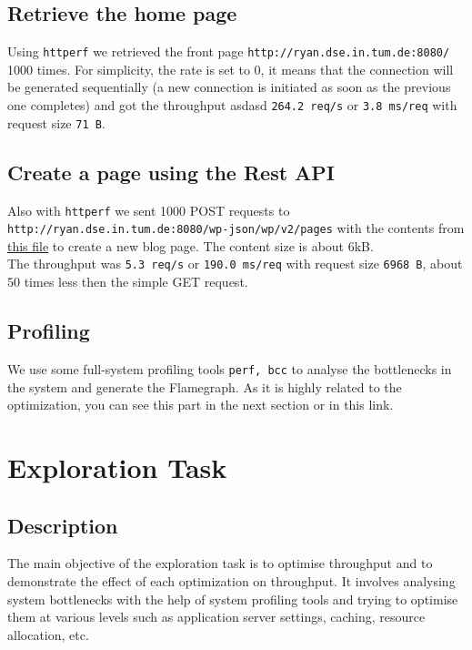 \subsection{Retrieve the home page}

Using \texttt{httperf} we retrieved the front page \texttt{http://ryan.dse.in.tum.de:8080/} 1000 times. For simplicity, the rate is set to 0, it means that the connection will be generated sequentially (a new connection is initiated as soon as the previous one completes) and got the throughput asdasd \texttt{264.2 req/s} or \texttt{3.8 ms/req} with request size \texttt{71 B}.

\subsection{Create a page using the Rest API}

Also with \texttt{httperf} we sent 1000 POST requests to \texttt{http://ryan.dse.in.tum.de:8080/wp-json/wp/v2/pages} with the contents from \href{https://github.com/danbachar/swiss-knife/blob/master/task1/benchmark/bench2_content}{this file} to create a new blog page. The content size is about 6kB.\\
The throughput was \texttt{5.3 req/s} or \texttt{190.0 ms/req} with request size \texttt{6968 B}, about 50 times less then the simple GET request.

\subsection{Profiling}
We use some full-system profiling tools \texttt{perf, bcc} to analyse the bottlenecks in the system and generate the Flamegraph. As it is highly related to the optimization, you can see this part in the next section or in this link.

\section{Exploration Task}

\subsection{Description}

The main objective of the exploration task is to optimise throughput and to demonstrate the effect of each optimization on throughput. It involves analysing system bottlenecks with the help of system profiling tools and trying to optimise them at various levels such as application server settings, caching, resource allocation, etc.

